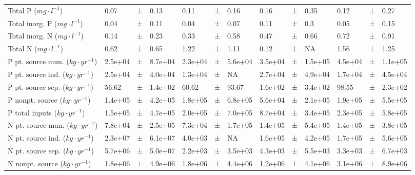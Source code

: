 \documentclass[journal abbreviations, manuscript]{copernicus}
\begin{document}
\begin{table}[t]
\begin{tabular}{lllllllllllll}
Total P ($mg \cdot l^{-1}$) & 0.07 & ± & 0.13 & 0.11 & ± & 0.16 & 0.16 & ± & 0.35 & 0.12 & ± & 0.27\\

Total inorg. P ($mg \cdot l^{-1}$) & 0.04 & ± & 0.11 & 0.04 & ± & 0.07 & 0.11 & ± & 0.3 & 0.05 & ± & 0.15\\

Total inorg. N ($mg \cdot l^{-1}$) & 0.14 & ± & 0.23 & 0.33 & ± & 0.58 & 0.47 & ± & 0.66 & 0.72 & ± & 0.91\\

Total N ($mg \cdot l^{-1}$) & 0.62 & ± & 0.65 & 1.22 & ± & 1.11 & 0.12 & ± & NA & 1.56 & ± & 1.25\\

P pt. source mun. ($kg \cdot yr^{-1}$) & 2.5e+04 & ± & 8.7e+04 & 2.3e+04 & ± & 5.6e+04 & 3.5e+04 & ± & 1.5e+05 & 4.5e+04 & ± & 1.1e+05\\

P pt. source ind. ($kg \cdot yr^{-1}$) & 2.5e+04 & ± & 4.0e+04 & 1.3e+04 & ± & NA & 2.7e+04 & ± & 4.9e+04 & 1.7e+04 & ± & 4.5e+04\\

P pt. source sep. ($kg \cdot yr^{-1}$) & 56.62 & ± & 1.4e+02 & 60.62 & ± & 93.67 & 1.6e+02 & ± & 3.4e+02 & 98.55 & ± & 2.3e+02\\

P nonpt. source ($kg \cdot yr^{-1}$) & 1.4e+05 & ± & 4.2e+05 & 1.8e+05 & ± & 6.8e+05 & 5.6e+04 & ± & 2.1e+05 & 1.9e+05 & ± & 5.5e+05\\

P total inputs ($kg \cdot yr^{-1}$) & 1.5e+05 & ± & 4.7e+05 & 2.0e+05 & ± & 7.0e+05 & 8.7e+04 & ± & 3.4e+05 & 2.3e+05 & ± & 5.8e+05\\

N pt. source mun. ($kg \cdot yr^{-1}$) & 7.8e+04 & ± & 2.5e+05 & 7.3e+04 & ± & 1.7e+05 & 1.4e+05 & ± & 5.4e+05 & 1.4e+05 & ± & 3.8e+05\\

N pt. source ind. ($kg \cdot yr^{-1}$) & 2.3e+07 & ± & 6.1e+07 & 4.0e+03 & ± & NA & 1.6e+05 & ± & 4.2e+05 & 1.7e+05 & ± & 5.6e+05\\

N pt. source sep. ($kg \cdot yr^{-1}$) & 5.7e+06 & ± & 5.0e+07 & 2.2e+03 & ± & 3.5e+03 & 4.3e+03 & ± & 5.5e+03 & 3.3e+03 & ± & 6.7e+03\\

N nonpt. source ($kg \cdot yr^{-1}$) & 1.8e+06 & ± & 4.9e+06 & 1.8e+06 & ± & 4.4e+06 & 1.2e+06 & ± & 4.1e+06 & 3.1e+06 & ± & 8.9e+06\\


\end{tabular}
\end{table}
\end{document}
